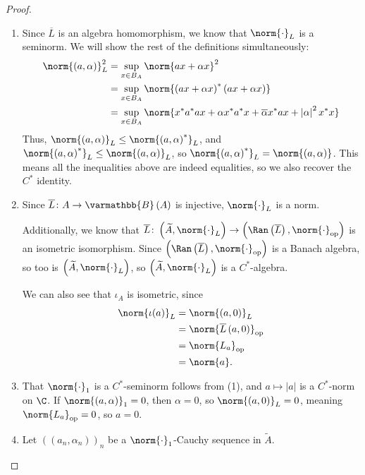 \documentclass[10pt]{mypackage}
\renewcommand*{\mathbb}[1]{\varmathbb{#1}}
\newcommand{\B}{\mathbb{B}}
\DeclareMathOperator{\op}{op}
\begin{document}
\begin{proof}\hfill
  \begin{enumerate}[(1)]
    \item Since $\overline{L}$ is an algebra homomorphism, we know that $\norm{\cdot}_L$ is a seminorm. We will show the rest of the definitions simultaneously:
      \begin{align*}
        \norm{\left(a,\alpha\right)}_L^2 &= \sup_{x\in B_A}\norm{ax + \alpha x}^2\\
                                         &= \sup_{x\in B_A}\norm{\left(ax + \alpha x\right)^{\ast}\left(ax + \alpha x\right)}\\
                                         &= \sup_{x\in B_A}\norm{x^{\ast}a^{\ast}ax + \alpha x^{\ast}a^{\ast}x + \overline{\alpha}x^{\ast}ax + \left\vert \alpha \right\vert^2 x^{\ast}x}
      \end{align*}
      Thus, $\norm{\left(a,\alpha\right)}_L \leq \norm{\left(a,\alpha\right)^{\ast}}_L$, and $\norm{\left(a,\alpha\right)^{\ast}}_L\leq \norm{\left(a,\alpha\right)}_L$, so $\norm{\left(a,\alpha\right)^{\ast}}_L = \norm{\left(a,\alpha\right)}$. This means all the inequalities above are indeed equalities, so we also recover the $C^{\ast}$ identity.
    \item Since $\overline{L}\colon A\rightarrow \B\left(A\right)$ is injective, $\norm{\cdot}_L$ is a norm.\newline

      Additionally, we know that $\overline{L}\colon \left(\widetilde{A},\norm{\cdot}_L\right) \rightarrow \left(\Ran\left(\overline{L}\right),\norm{\cdot}_{\op}\right)$ is an isometric isomorphism. Since $\left(\Ran\left(\overline{L}\right),\norm{\cdot}_{\op}\right)$ is a Banach algebra, so too is $\left(\widetilde{A},\norm{\cdot}_L\right)$, so $\left(\widetilde{A},\norm{\cdot}_L\right)$ is a $C^{\ast}$-algebra.\newline

      We can also see that $\iota_A$ is isometric, since
      \begin{align*}
        \norm{\iota(a)}_L &= \norm{\left(a,0\right)}_L\\
                          &= \norm{\overline{L}\left(a,0\right)}_{\op}\\
                          &= \norm{L_a}_{\op}\\
                          &= \norm{a}.
      \end{align*}
    \item That $\norm{\cdot}_1$ is a $C^{\ast}$-seminorm follows from (1), and $a\mapsto \left\vert a \right\vert$ is a $C^{\ast}$-norm on $\C$. If $\norm{\left(a,\alpha\right)}_1 = 0$, then $\alpha = 0$, so $\norm{\left(a,0\right)}_L = 0$, meaning $\norm{L_a}_{\op} = 0$, so $a = 0$.
    \item Let $\left(\left(a_n,\alpha_n\right)\right)_n$ be a $\norm{\cdot}_1$-Cauchy sequence in $\widetilde{A}$.\newline


\end{enumerate}
\end{proof}
\end{document}
